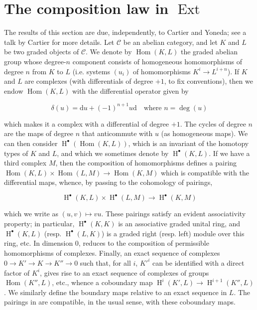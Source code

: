 \section{The composition law in $\operatorname{Ext}$}\label{fga1-2}

The results of this section are due, independently, to Cartier and Yoneda;
see a talk by Cartier \cite{Car1957} for more details.
Let $\mathcal{C}$ be an abelian category, and let $K$ and $L$ be two graded objects of $\mathcal{C}$.
We denote by $\operatorname{Hom}(K,L)$ the graded abelian group whose degree-$n$ component consists of homogeneous homomorphisms of degree $n$ from $K$ to $L$ (i.e. systems $(u_i)$ of homomorphisms $K^i\to L^{i+n}$).
If $K$ and $L$ are complexes (with differentials of degree $+1$, to fix conventions), then we endow $\operatorname{Hom}(K,L)$ with the differential operator given by

\begin{equation}\tag{2.1}\label{fga1-equation-2.1}
  \delta(u) = \mathrm{d}u + (-1)^{n+1}u\mathrm{d} \quad\text{where }n=\deg(u)
\end{equation}

which makes it a complex with a differential of degree $+1$.
The cycles of degree $n$ are the maps of degree $n$ that anticommute with $u$ (as homogeneous maps).
We can then consider $\operatorname{H}^\bullet(\operatorname{Hom}(K,L))$, which is an invariant of the homotopy types of $K$ and $L$, and which we sometimes denote by $\operatorname{H}^\bullet(K,L)$.
If we have a third complex $M$, then the composition of homomorphisms defines a pairing $\operatorname{Hom}(K,L)\times\operatorname{Hom}(L,M)\to\operatorname{Hom}(K,M)$ which is compatible with the differential maps, whence, by passing to the cohomology of pairings,

\begin{equation}\tag{2.2}\label{fga1-equation-2.2}
  \operatorname{H}^\bullet(K,L)\times\operatorname{H}^\bullet(L,M) \to \operatorname{H}^\bullet(K,M)
\end{equation}

which we write as $(u,v)\mapsto vu$.
These pairings satisfy an evident associativity property;
in particular, $\operatorname{H}^\bullet(K,K)$ is an associative graded unital ring, and $\operatorname{H}^\bullet(K,L)$ (resp. $\operatorname{H}^\bullet(L,K)$) is a graded right (resp. left) module over this ring, etc.
In dimension $0$,  reduces to the composition of permissible homomorphisms of complexes.
Finally, an exact sequence of complexes $0\to K'\to K\to K''\to0$ such that, for all $i$, $K'^i$ can be identified with a direct factor of $K^i$, gives rise to an exact sequence of complexes of groups $\operatorname{Hom}(K'',L)$, etc., whence a coboundary map $\operatorname{H}^i(K',L)\to\operatorname{H}^{i+1}(K'',L)$.
We similarly define the boundary maps relative to an exact sequence in $L$.
The pairings in  are compatible, in the usual sense, with these coboundary maps.

